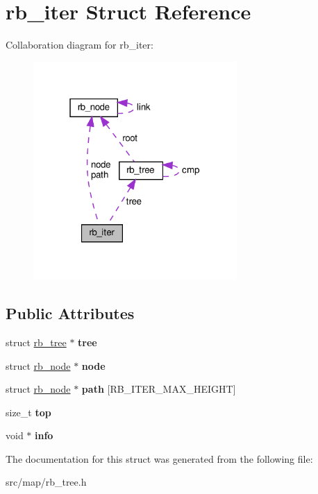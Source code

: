 \hypertarget{structrb__iter}{}\section{rb\+\_\+iter Struct Reference}
\label{structrb__iter}


Collaboration diagram for rb\+\_\+iter\+:\nopagebreak
\begin{figure}[H]
\begin{center}
\leavevmode
\includegraphics[width=220pt]{structrb__iter__coll__graph}
\end{center}
\end{figure}
\subsection*{Public Attributes}
\begin{DoxyCompactItemize}
\item 
\mbox{\label{structrb__iter_aa7d16e8bd1c481afb06b660f9921c282}} 
struct \hyperlink{structrb__tree}{rb\+\_\+tree} $\ast$ {\bfseries tree}
\item 
\mbox{\label{structrb__iter_aa100152b6704697647b9f9c1b83b8b58}} 
struct \hyperlink{structrb__node}{rb\+\_\+node} $\ast$ {\bfseries node}
\item 
\mbox{\label{structrb__iter_a140f9483858ea4aa231d2c242153edbc}} 
struct \hyperlink{structrb__node}{rb\+\_\+node} $\ast$ {\bfseries path} \mbox{[}R\+B\+\_\+\+I\+T\+E\+R\+\_\+\+M\+A\+X\+\_\+\+H\+E\+I\+G\+HT\mbox{]}
\item 
\mbox{\label{structrb__iter_a9f69bb4c1811ae482b9cc8962fc0eea9}} 
size\+\_\+t {\bfseries top}
\item 
\mbox{\label{structrb__iter_a02f1339882a40f5319301767791f9b8e}} 
void $\ast$ {\bfseries info}
\end{DoxyCompactItemize}


The documentation for this struct was generated from the following file\+:\begin{DoxyCompactItemize}
\item 
src/map/rb\+\_\+tree.\+h\end{DoxyCompactItemize}
